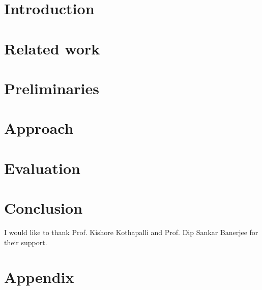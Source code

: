 \documentclass[sigconf,nonacm]{acmart}
\begin{document}





\maketitle

\section{Introduction}
\label{sec:introduction}


\section{Related work}
\label{sec:related}


\section{Preliminaries}
\label{sec:preliminaries}


\section{Approach}
\label{sec:approach}


\section{Evaluation}
\label{sec:evaluation}


\section{Conclusion}
\label{sec:conclusion}


\begin{acks}
I would like to thank Prof. Kishore Kothapalli and Prof. Dip Sankar Banerjee for their support.
\end{acks}




\clearpage
\appendix
\section{Appendix}

\end{document}
